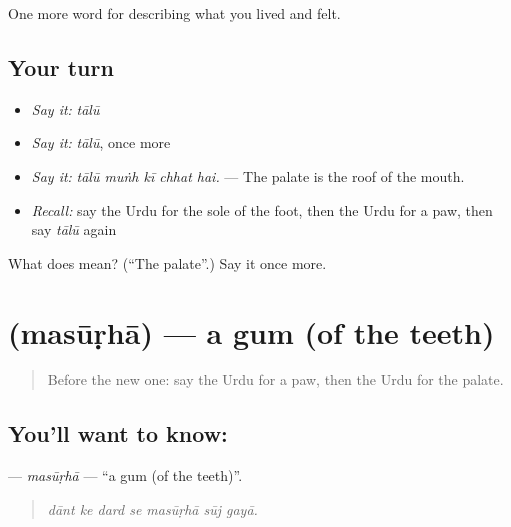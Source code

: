 \begin{grammarlens}[title={What you've built}]
One more word for describing what you lived and felt.
\end{grammarlens}

\subsection*{Your turn}
\begin{itemize}
\raggedright
  \item \emph{Say it:} \emph{tālū}
  \item \emph{Say it:} \emph{tālū}, once more
  \item \emph{Say it:} \emph{tālū muṅh kī chhat hai.} — The palate is the roof of the mouth.
  \item \emph{Recall:} say the Urdu for the sole of the foot, then the Urdu for a paw, then say \emph{tālū} again
\end{itemize}

\begin{tcolorbox}[breakable,colback=teal!4,colframe=teal!35!black,title={Before you move on}]
What does  mean? (\textquotedblleft{}The palate\textquotedblright{}.) Say it once more.
\end{tcolorbox}
\section[\texorpdfstring{\ur{مسوڑھا} (masūṛhā)}{مسوڑھا (masūṛhā)}]{ (masūṛhā) — a gum (of the teeth)}

\label{lesson:UR-C467-masurha}



\begin{quote}
Before the new one: say the Urdu for a paw, then the Urdu for the palate.
\end{quote}

\subsection*{You'll want to know: }
\textbf{} — \emph{masūṛhā} — \textquotedblleft{}a gum (of the teeth)\textquotedblright{}.

\begin{quote}
      
\end{quote}

\begin{quote}
\emph{dānt ke dard se masūṛhā sūj gayā.}
\end{quote}

